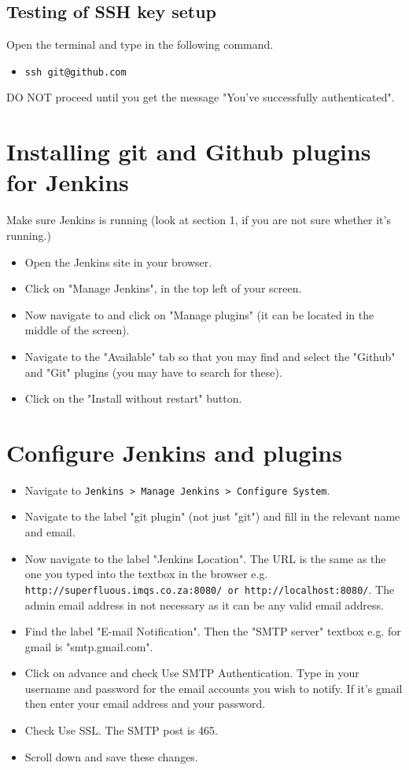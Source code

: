 \documentclass{article}
\begin{document}
\subsection{Testing of SSH key setup}
Open the terminal and type in the following command.
\begin{itemize}
\item{\verb#ssh git@github.com#}
\end{itemize}
DO NOT proceed until you get the message "You've successfully authenticated".


\section{Installing git and Github plugins for Jenkins}
Make sure Jenkins is running (look at section 1, if you are not sure whether it's running.) 
\begin{itemize}
\item{Open the Jenkins site in your browser.}
\item{Click on "Manage Jenkins", in the top left of your screen.}
\item{Now navigate to and click on "Manage plugins" (it can be located in the middle of the screen).}
\item{Navigate to the "Available" tab so that you may find and select the "Github" and "Git" plugins (you may have to search for these).}
\item{Click on the "Install without restart" button.}
\end{itemize}


\section{Configure Jenkins and plugins}
\begin{itemize}
\item{Navigate to \verb#Jenkins > Manage Jenkins > Configure System#.}
\item{Navigate to the label "git plugin" (not just "git") and fill in the relevant name and email.}
\item{Now navigate to the label "Jenkins Location". The URL is the same as the one you typed into the textbox in the browser e.g.\\
\verb#http://superfluous.imqs.co.za:8080/ or http://localhost:8080/#. The admin email address in not necessary as it can be any valid email address.}
\item{Find the label "E-mail Notification". Then the "SMTP server" textbox e.g. for gmail is "smtp.gmail.com".}
\item{Click on advance and check Use SMTP Authentication. Type in your username and password for the email accounts you wish to notify. If it's gmail then enter your email address and your password.}
\item{Check Use SSL. The SMTP post is 465.}
\item{Scroll down and save these changes.}
\end{itemize}
\end{document}
